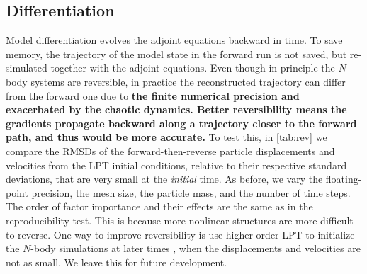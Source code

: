 \documentclass[modern, dvipsnames]{aastex631}
\newcommand{\HL}[1]{\textcolor{Bittersweet}{\textbf{#1}}}
\begin{document}
\vspace{1em}
\subsection{Differentiation}

Model differentiation evolves the adjoint equations backward in time.
To save memory, the trajectory of the model state in the forward run is
not saved, but re-simulated together with the adjoint equations.
Even though in principle the $N$-body systems are reversible, in
practice the reconstructed trajectory can differ from the forward one
due to \HL{the finite numerical precision and exacerbated by the chaotic
dynamics.
Better reversibility means the gradients propagate backward along a
trajectory closer to the forward path, and thus would be more accurate.}
To test this, in \autoref{tab:rev} we compare the RMSDs of the
forward-then-reverse particle displacements and velocities from the LPT
initial conditions, relative to their respective standard deviations,
that are very small at the \emph{initial} time.
As before, we vary the floating-point precision, the mesh size, the
particle mass, and the number of time steps.
The order of factor importance and their effects are the same as in the
reproducibility test.
This is because more nonlinear structures are more difficult to reverse.
One way to improve reversibility is use higher order LPT to initialize
the $N$-body simulations at later times \citep{MichauxEtAl2021}, when
the displacements and velocities are not as small.
We leave this for future development.
\end{document}
